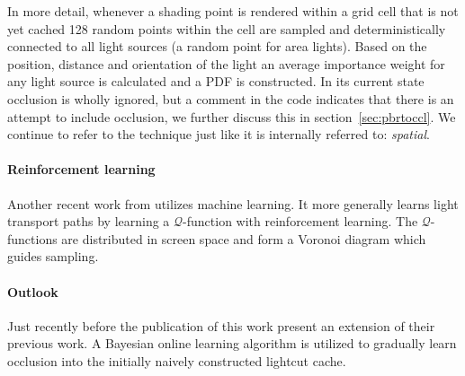In more detail, whenever a shading point is rendered within a grid cell that is not yet cached 128 random points within the cell are sampled and deterministically connected to all light sources (a random point for area lights). Based on the position, distance and orientation of the light an average importance weight for any light source is calculated and a PDF is constructed. In its current state occlusion is wholly ignored, but a comment in the code indicates that there is an attempt to include occlusion, we further discuss this in section~\ref{sec:pbrtoccl}. We continue to refer to the technique just like it is internally referred to: \textit{spatial}.

\paragraph{Reinforcement learning}

Another recent work from \parencite{DBLP:journals/corr/DahmK17} utilizes machine learning. It more generally learns light transport paths by learning a $\mathcal{Q}$-function with reinforcement learning. The $\mathcal{Q}$-functions are distributed in screen space and form a Voronoi diagram which guides sampling.

\paragraph{Outlook}

Just recently before the publication of this work \textcite{Vevoda:2018:BOR} present an extension of their previous work. A Bayesian online learning algorithm is utilized to gradually learn occlusion into the initially naively constructed lightcut cache.  